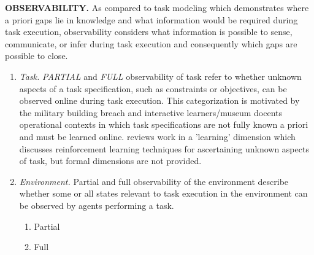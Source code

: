 \documentclass[letterpaper, 10 pt, conference]{ieeeconf}  %
\theoremstyle{definition}
\newcommand{\citet}[1]{\citeauthor{#1}~\cite{#1}}
\begin{document}
\begin{enumerate}
{
\color{blue}
\item \textbf{OBSERVABILITY.}
As compared to task modeling which demonstrates where a priori gaps lie in knowledge and what information would be required during task execution, observability considers what information is possible to sense, communicate, or infer during task execution and consequently which gaps are possible to close.

\begin{enumerate}
    \item \textit{Task.}
    \textit{PARTIAL} and \textit{FULL} observability of task refer to whether unknown aspects of a task specification, such as constraints or objectives, can be observed online during task execution. This categorization is motivated by the military building breach and interactive learners/museum docents operational contexts in which task specifications are not fully known a priori and must be learned online. \cite{cao1997cooperative} reviews work in a 'learning' dimension which discusses reinforcement learning techniques for ascertaining unknown aspects of task, but formal dimensions are not provided.
    
    \item \textit{Environment.}
    Partial and full observability of the environment describe whether some or all states relevant to task execution in the environment can be observed by agents performing a task.
    \begin{enumerate}
        \item Partial \cite{hadfield2016cooperative}
        \item Full \cite{nikolaidis2017game}
    \end{enumerate}
    

\end{enumerate}}
\end{enumerate}
\end{document}
